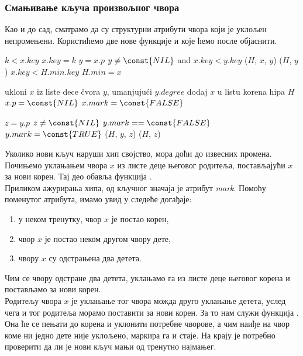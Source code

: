 \documentclass[11pt, a4paper]{article}
\theoremstyle{remark}
\numberwithin{equation}{section}
\begin{document}
	\subsubsection{Смањивање кључа произвољног чвора}
	
	Као и до сад, сматрамо да су структурни атрибути чвора који је уклољен непромењени. Користићемо две нове функције  и  које ћемо после објаснити.
	
	\begin{codebox}
		\zi \Comment $k<x.key$
		\li $x.key=k$
		\li $y=x.p$
		\li \If $y \neq \const{NIL}$ and $x.key<y.key$
		\li \Do {}($H$, $x$, $y$)
		\li {}($H$, $y$)
		\End
		\li \If $x.key<H.min.key$
		\li \Do $H.min=x$
		\End
	\end{codebox}

	\begin{codebox}
		\Procname{\proc{Cut}($H$, $x$, $y$)}
		\li ukloni $x$ iz liste dece čvora $y$, umanjujući $y.degree$
		\li dodaj $x$ u listu korena hipa $H$
		\li $x.p=\const{NIL}$
		\li $x.mark=\const{FALSE}$
	\end{codebox}
	
	\begin{codebox}
		\Procname{\proc{Cascading-Cut}($H$, $y$)}
		\li $z=y.p$
		\li \If $z \neq \const{NIL}$
		\li \Do \If $y.mark==\const{FALSE}$
		\li \Do $y.mark=\const{TRUE}$
		\End
		\li \Do \Else {}($H$, $y$, $z$)
		\li {} ($H$, $z$)
		\End
	\end{codebox}

	\noindent Уколико нови кључ наруши хип својство, мора доћи до извесних промена. Почињемо уклањањем чвора $x$ из листе деце његовог родитеља, постављајући $x$ за нови корен. Тај део обавља функција . \\
	
	\indent Приликом ажурирања хипа, од кључног значаја је атрибут \textit{mark}. Помоћу поменутог атрибута, имамо увид у следеће догађаје:
	
	\begin{enumerate}
		\item у неком тренутку, чвор $x$ је постао корен,
		\item чвор $x$ је постао неком другом чвору дете,
		\item чвору $x$ су одстрањена два детета.
	\end{enumerate}

	\noindent Чим се чвору одстране два детета, уклањамо га из листе деце његовог корена и постављамо за нови корен. \\
	\indent Родитељу чвора $x$ је уклањање тог чвора можда друго уклањање детета, услед чега и тог родитеља морамо поставити за нови корен. За то нам служи функција . Она ће се пењати до корена и уклонити потребне чворове, а чим наиђе на чвор коме ни једно дете није уклољено, маркира га и стаје. На крају је потребно проверити да ли је нови кључ мањи од тренутно најмањег. \\
	
\end{document}
